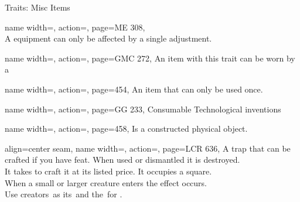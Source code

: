 \begin{PageFront}
\begin{Tables}{\frontTableHeight}
\begin{Table}{Traits: Misc Items}
\begin{entry}{}{%
                name width=\conditionLength,%
                action=\Adjustment,
                page=ME 308,
            }
                \\
                A equipment can only be affected by a single adjustment. \hfill
            \end{entry}
            \begin{entry}{}{%
                name width=\conditionLength,%
                action=\Companion,
                page=GMC 272,
            }
                An item with this trait can be worn by a 
            \end{entry}
            \begin{entry}{}{%
                name width=\conditionLength,%
                action=\Consumable,
                page=454,
            }
                An item that can only be used once. \hfill
            \end{entry}
            \begin{entry}{}{%
                name width=\conditionLength,%
                action=\Gadget,
                page=GG 233,
            }
                Consumable Technological inventions
            \end{entry}
            \begin{entry}{}{%
                name width=\conditionLength,%
                action=\Mechanical,
                page=458,
            }
                Is a constructed physical object.
            \end{entry}
            \begin{entry}{}{%
                align=center seam,
                name width=\conditionLength,%
                action=\Snare,
                page=LCR 636,
            }
                A trap that can be crafted if you have  feat.
                When used or dismantled it is destroyed.\\
                It takes  to craft it at its listed price.
                It occupies a  \Feet square. \hfill
                \\
                When a small or larger creature enters the effect occurs.\\
                Use creators \CraftingT \DC\,as its \StealthT \DC\,and the \DC\,for . \hfill

\end{entry}
\end{Table}
\end{Tables}
\end{PageFront}

